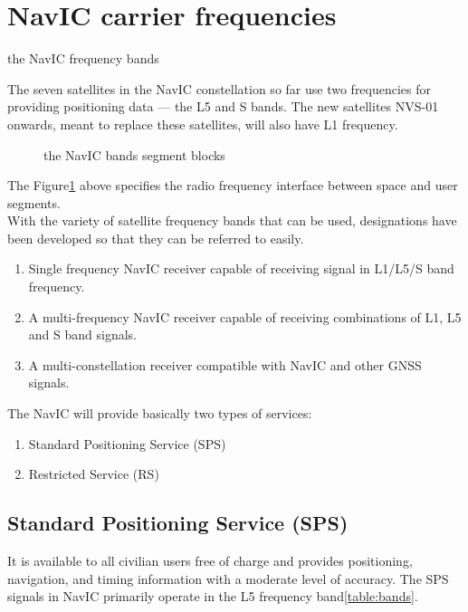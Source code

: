 \section{NavIC carrier frequencies}	
\begin{table}[!ht]
	\small
	\centering
	\caption{the NavIC frequency bands}
	\label{table:bands}
	
	\end{table}
\noindent The seven satellites in the NavIC constellation so far use two frequencies for providing positioning data — the L5 and S bands. The new satellites NVS-01 onwards, meant to replace these satellites, will also have L1 frequency.


	\begin{figure}[!ht]
	\centering
	
	\caption{the NavIC bands segment blocks}
	\label{figs:bandsfig}
	\end{figure}
\noindent The Figure\ref{figs:bandsfig} above specifies the radio frequency interface between space and user segments.
\\
With the variety of satellite frequency bands that can be used, designations have been developed so that they can be referred to easily. 
\begin{enumerate}
	\item Single frequency NavIC receiver capable of receiving signal in L1/L5/S band frequency.
	\item A multi-frequency NavIC receiver capable of receiving combinations of L1, L5 and S band signals.
	\item A multi-constellation receiver compatible with NavIC and other GNSS signals.
\end{enumerate}
The NavIC will provide basically two types of services:
	\begin{enumerate}
	\item Standard Positioning Service (SPS)
	\item Restricted Service (RS)
	\end{enumerate}

		

\subsection{Standard Positioning Service (SPS)}
	It is available to all civilian users free of charge and provides positioning, navigation, and timing information with a moderate level of accuracy. The SPS signals in NavIC primarily operate in the L5 frequency band\ref{table:bands}.
